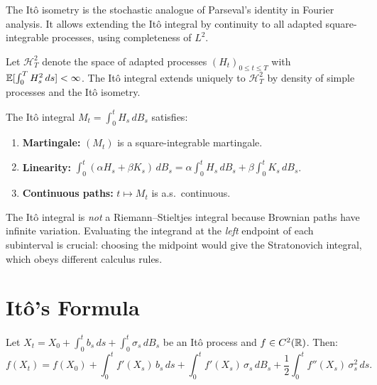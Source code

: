 \begin{intuition}
The It\^o isometry is the stochastic analogue of Parseval's identity
in Fourier analysis. It allows extending the It\^o integral by
continuity to all adapted square-integrable processes, using
completeness of $L^2$.
\end{intuition}

\begin{definition}[Extension to $L^2$]
Let $\mathcal{H}^2_T$ denote the space of adapted processes
$(H_t)_{0 \leq t \leq T}$ with $\mathbb{E}[\int_0^T H_s^2\,ds] < \infty$.
The It\^o integral extends uniquely to $\mathcal{H}^2_T$ by density of
simple processes and the It\^o isometry.
\end{definition}

\begin{proposition}
\label{prop:ito_properties}
The It\^o integral $M_t = \int_0^t H_s\,dB_s$ satisfies:
\begin{enumerate}
  \item \textbf{Martingale:} $(M_t)$ is a square-integrable martingale.
  \item \textbf{Linearity:} $\int_0^t (\alpha H_s + \beta K_s)\,dB_s
    = \alpha\int_0^t H_s\,dB_s + \beta\int_0^t K_s\,dB_s$.
  \item \textbf{Continuous paths:} $t \mapsto M_t$ is a.s.\ continuous.
\end{enumerate}
\end{proposition}

\begin{attention}
The It\^o integral is \emph{not} a Riemann--Stieltjes integral because
Brownian paths have infinite variation. Evaluating the integrand at
the \emph{left} endpoint of each subinterval is crucial: choosing the
midpoint would give the Stratonovich integral,
which obeys different calculus rules.
\end{attention}

\section{It\^o's Formula}
\label{sec:ito_formula}

\begin{theorem}
\label{thm:ito_formula}
Let $X_t = X_0 + \int_0^t b_s\,ds + \int_0^t \sigma_s\,dB_s$ be an
It\^o process and $f \in C^2(\mathbb{R})$. Then:
\[
  f(X_t) = f(X_0) + \int_0^t f'(X_s)\,b_s\,ds
    + \int_0^t f'(X_s)\,\sigma_s\,dB_s
    + \frac{1}{2}\int_0^t f''(X_s)\,\sigma_s^2\,ds.
\]
\end{theorem}

